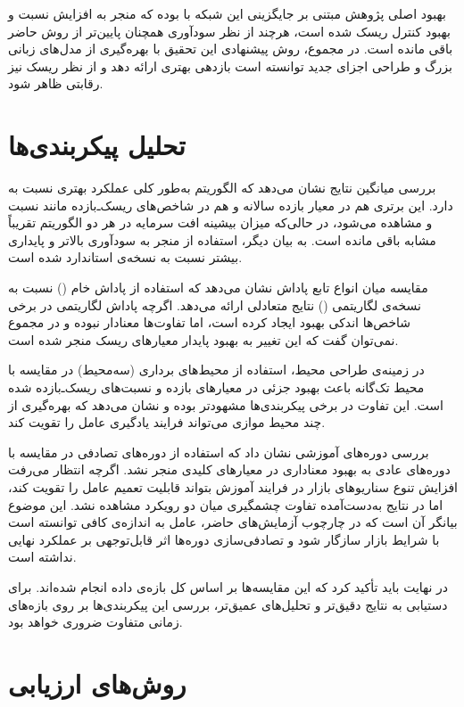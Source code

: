 \documentclass[12pt, a4paper]{report}
\begin{document}
بهبود اصلی پژوهش مبتنی بر  جایگزینی این شبکه با  بوده که منجر به افزایش نسبت  و بهبود کنترل ریسک شده است، هرچند از نظر سودآوری همچنان پایین‌تر از روش حاضر باقی مانده است. 
در مجموع، روش پیشنهادی این تحقیق با بهره‌گیری از مدل‌های زبانی بزرگ و طراحی اجزای جدید توانسته است بازدهی بهتری ارائه دهد و از نظر ریسک نیز رقابتی ظاهر شود.

\section{تحلیل پیکربندی‌ها}

بررسی میانگین نتایج نشان می‌دهد که الگوریتم  به‌طور کلی عملکرد بهتری نسبت به  دارد. 
این برتری هم در معیار بازده سالانه و هم در شاخص‌های ریسک‌ـ‌بازده مانند نسبت  و  مشاهده می‌شود، در حالی‌که میزان بیشینه افت سرمایه در هر دو الگوریتم تقریباً مشابه باقی مانده است. 
به بیان دیگر، استفاده از  منجر به سودآوری بالاتر و پایداری بیشتر نسبت به نسخه‌ی استاندارد  شده است.  

مقایسه میان انواع تابع پاداش نشان می‌دهد که استفاده از پاداش خام () نسبت به نسخه‌ی لگاریتمی () نتایج متعادلی ارائه می‌دهد. 
اگرچه پاداش لگاریتمی در برخی شاخص‌ها اندکی بهبود ایجاد کرده است، اما تفاوت‌ها معنادار نبوده و در مجموع نمی‌توان گفت که این تغییر به بهبود پایدار معیارهای ریسک منجر شده است.  

در زمینه‌ی طراحی محیط، استفاده از محیط‌های برداری (سه‌محیط) در مقایسه با محیط تک‌گانه باعث بهبود جزئی در معیارهای بازده و نسبت‌های ریسک‌ـ‌بازده شده است. 
این تفاوت در برخی پیکربندی‌ها مشهودتر بوده و نشان می‌دهد که بهره‌گیری از چند محیط موازی می‌تواند فرایند یادگیری عامل را تقویت کند.  

بررسی دوره‌های آموزشی نشان داد که استفاده از دوره‌های تصادفی در مقایسه با دوره‌های عادی به بهبود معناداری در معیارهای کلیدی منجر نشد. 
اگرچه انتظار می‌رفت افزایش تنوع سناریوهای بازار در فرایند آموزش بتواند قابلیت تعمیم عامل را تقویت کند، اما در نتایج به‌دست‌آمده تفاوت چشمگیری میان دو رویکرد مشاهده نشد. 
این موضوع بیانگر آن است که در چارچوب آزمایش‌های حاضر، عامل به اندازه‌ی کافی توانسته است با شرایط بازار سازگار شود و تصادفی‌سازی دوره‌ها اثر قابل‌توجهی بر عملکرد نهایی نداشته است.

در نهایت باید تأکید کرد که این مقایسه‌ها بر اساس کل بازه‌ی داده انجام شده‌اند. 
برای دستیابی به نتایج دقیق‌تر و تحلیل‌های عمیق‌تر، بررسی این پیکربندی‌ها بر روی بازه‌های زمانی متفاوت ضروری خواهد بود.

\section{روش‌های ارزیابی}
\end{document}
